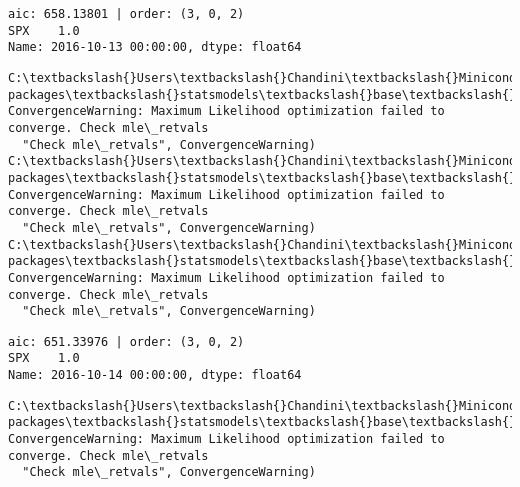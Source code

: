 \documentclass[11pt]{article}
\begin{document}
    \begin{Verbatim}[commandchars=\\\{\}]
aic: 658.13801 | order: (3, 0, 2)
SPX    1.0
Name: 2016-10-13 00:00:00, dtype: float64

    \end{Verbatim}

    \begin{Verbatim}[commandchars=\\\{\}]
C:\textbackslash{}Users\textbackslash{}Chandini\textbackslash{}Miniconda3\textbackslash{}envs\textbackslash{}auquan\textbackslash{}lib\textbackslash{}site-packages\textbackslash{}statsmodels\textbackslash{}base\textbackslash{}model.py:496: ConvergenceWarning: Maximum Likelihood optimization failed to converge. Check mle\_retvals
  "Check mle\_retvals", ConvergenceWarning)
C:\textbackslash{}Users\textbackslash{}Chandini\textbackslash{}Miniconda3\textbackslash{}envs\textbackslash{}auquan\textbackslash{}lib\textbackslash{}site-packages\textbackslash{}statsmodels\textbackslash{}base\textbackslash{}model.py:496: ConvergenceWarning: Maximum Likelihood optimization failed to converge. Check mle\_retvals
  "Check mle\_retvals", ConvergenceWarning)
C:\textbackslash{}Users\textbackslash{}Chandini\textbackslash{}Miniconda3\textbackslash{}envs\textbackslash{}auquan\textbackslash{}lib\textbackslash{}site-packages\textbackslash{}statsmodels\textbackslash{}base\textbackslash{}model.py:496: ConvergenceWarning: Maximum Likelihood optimization failed to converge. Check mle\_retvals
  "Check mle\_retvals", ConvergenceWarning)

    \end{Verbatim}

    \begin{Verbatim}[commandchars=\\\{\}]
aic: 651.33976 | order: (3, 0, 2)
SPX    1.0
Name: 2016-10-14 00:00:00, dtype: float64

    \end{Verbatim}

    \begin{Verbatim}[commandchars=\\\{\}]
C:\textbackslash{}Users\textbackslash{}Chandini\textbackslash{}Miniconda3\textbackslash{}envs\textbackslash{}auquan\textbackslash{}lib\textbackslash{}site-packages\textbackslash{}statsmodels\textbackslash{}base\textbackslash{}model.py:496: ConvergenceWarning: Maximum Likelihood optimization failed to converge. Check mle\_retvals
  "Check mle\_retvals", ConvergenceWarning)

    \end{Verbatim}
\end{document}
